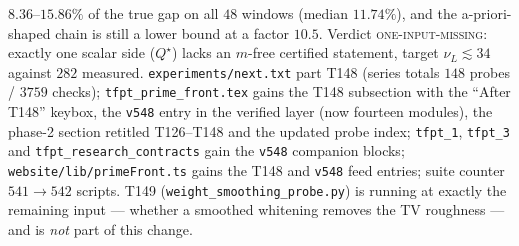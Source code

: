 \documentclass[11pt]{article}
\begin{document}
\begin{itemize}[leftmargin=1.5em]
$8.36$--$15.86\%$ of the true gap on all $48$ windows (median $11.74\%$), and the
a-priori-shaped chain is still a lower bound at a factor $10.5$. Verdict
\textsc{one-input-missing}: exactly one scalar side ($Q^\star$) lacks an $m$-free certified
statement, target $\nu_L\lesssim34$ against $282$ measured.
\texttt{experiments/next.txt} part T148 (series totals $148$ probes / $3759$ checks);
\texttt{tfpt\_prime\_front.tex} gains the T148 subsection with the ``After T148'' keybox, the
\texttt{v548} entry in the verified layer (now fourteen modules), the phase-2 section retitled
T126--T148 and the updated probe index; \texttt{tfpt\_1}, \texttt{tfpt\_3} and
\texttt{tfpt\_research\_contracts} gain the \texttt{v548} companion blocks;
\texttt{website/lib/primeFront.ts} gains the T148 and \texttt{v548} feed entries; suite counter
$541\to542$ scripts. T149 (\texttt{weight\_smoothing\_probe.py}) is running at exactly the
remaining input --- whether a smoothed whitening removes the TV roughness --- and is \emph{not}
part of this change.
\end{itemize}
\end{document}
